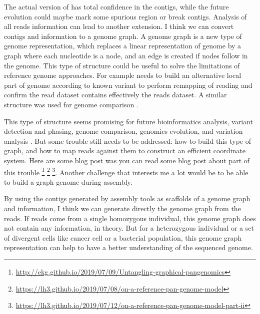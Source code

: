 \documentclass[main.tex]{subfiles}
\begin{document}
The actual version of \knot has total confidence in the contigs, while the future evolution could maybe mark some spurious region or break contigs. Analysis of all reads information can lead to another extension. I think we can convert contigs and \knot \OLC information to a genome graph. A genome graph is a new type of genome representation, which replaces a linear representation of genome by a graph where each nucleotide is a node, and an edge is created if nodes follow in the genome. This type of structure could be useful to solve the limitations of reference genome approaches. 
For example  \cite{whatshap} needs to build an alternative local part of genome according to known variant to perform remapping of reading and confirm the read dataset contains effectively the reads dataset. A similar structure was used for genome comparison  \cite{cactus_graph}.

This type of structure seems promising for future bioinformatics analysis, variant detection and phasing, genome comparison,  genomics evolution, and variation analysis \cite{goodbye_ref_hello_graphs}. But some trouble still needs to be addressed: how to build this type of graph, and how to map reads against them to construct an efficient coordinate system.
Here are some blog post was you can read some blog post about part of this trouble \footnote{\url{http://ekg.github.io/2019/07/09/Untangling-graphical-pangenomics}} \footnote{\url{https://lh3.github.io/2019/07/08/on-a-reference-pan-genome-model}} \footnote{\url{https://lh3.github.io/2019/07/12/on-a-reference-pan-genome-model-part-ii}}. Another challenge that interests me a lot would be to be able to build a graph genome during assembly.

By using the contigs generated by assembly tools as scaffolds of a genome graph and \knot \OLC information, I think we can generate directly the genome graph from the reads. If reads come from a single homozygous individual, this genome graph does not contain any information, in theory. But for a heterozygous individual or a set of divergent cells like cancer cell or a bacterial population, this genome graph representation can help to have a better understanding of the sequenced genome.
\end{document}
